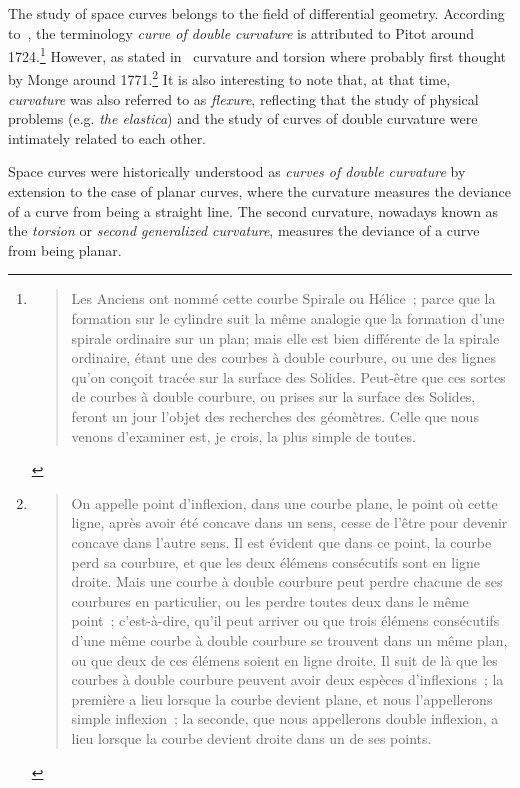 The study of space curves belongs to the field of differential geometry. According to~\cite[p.28]{Delcourt2007}, the terminology \emph{curve of double curvature} is attributed to Pitot around 1724.\footnote{\blockcquote[p.28]{Pitot1726}{Les Anciens ont nommé cette courbe Spirale ou Hélice~; parce que la formation sur le cylindre suit la même analogie que la formation d’une spirale ordinaire sur un plan; mais elle est bien différente de la spirale ordinaire, étant une des courbes à double courbure, ou une des lignes qu’on conçoit tracée sur la surface des Solides. Peut-être que ces sortes de courbes à double courbure, ou prises sur la surface des Solides, feront un jour l’objet des recherches des géomètres. Celle que nous venons d’examiner est, je crois, la plus simple de toutes.
}} However, as stated in~\cite[p.321]{Coolidge2013} curvature and torsion where probably first thought by Monge around 1771.\footnote{\blockcquote[p.363]{Monge1809}{On appelle point d'inflexion, dans une courbe plane, le point où cette ligne, après avoir été concave dans un sens, cesse de l'être pour devenir concave dans l'autre sens. Il est évident que dans ce point, la courbe perd sa courbure, et que les deux élémens consécutifs sont en ligne droite. Mais une courbe à double courbure peut perdre chacune de ses courbures en particulier, ou les perdre toutes deux dans le même point~; c'est-à-dire, qu'il peut arriver ou que trois élémens consécutifs d'une même courbe à double courbure se trouvent dans un même plan, ou que deux de ces élémens soient en ligne droite. Il suit de là que les courbes à double courbure peuvent avoir deux espèces d'inflexions~; la première a lieu lorsque la courbe devient plane, et nous l'appellerons simple inflexion~; la seconde, que nous appellerons double inflexion, a lieu lorsque la courbe devient droite dans un de ses points.}.} It is also interesting to note that, at that time, \emph{curvature} was also referred to as \emph{flexure}, reflecting that the study of physical problems (e.g. \emph{the elastica}) and the study of curves of double curvature were intimately related to each other.

Space curves were historically understood as \emph{curves of double curvature} by extension to the case of planar curves, where the curvature measures the deviance of a curve from being a straight line. The second curvature, nowadays known as the \emph{torsion} or \emph{second generalized curvature}, measures the deviance of a curve from being planar. 



